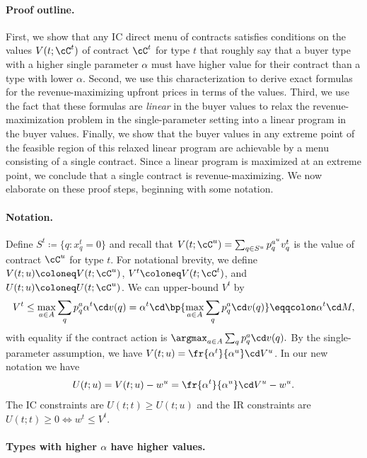 \paragraph{Proof outline.} First, we show that any IC direct menu of contracts satisfies conditions on the values $V(t;\cC^t)$ of contract $\cC^t$ for type $t$ that roughly say that a buyer type with a higher single parameter $\alpha$ must have higher value for their contract than a type with lower $\alpha$. Second, we use this characterization to derive exact formulas for the revenue-maximizing upfront prices in terms of the values. Third, we use the fact that these formulas are \emph{linear} in the buyer values to relax the revenue-maximization problem in the single-parameter setting into a linear program in the buyer values. Finally, we show that the buyer values in any extreme point of the feasible region of this relaxed linear program are achievable by a menu consisting of a single contract. Since a linear program is maximized at an extreme point, we conclude that a single contract is revenue-maximizing. We now elaborate on these proof steps, beginning with some notation.
 

\paragraph{Notation.}

Define $S^t \coloneq \{q : x^t_q = 0\}$ and recall that $V(t;\cC^u) = \sum_{q\in S^u} p^{a^u}_q v^t_q$ is the value of contract $\cC^u$ for type $t$. For notational brevity, we define $V(t;u) \coloneq V(t;\cC^u)$, $V^t \coloneq V(t;\cC^t)$, and $U(t;u) \coloneq U(t;\cC^u)$. We can upper-bound $V^t$ by $$V^t \le \max_{a\in A} \sum_q p^a_q \alpha^t \cd v(q) = \alpha^t \cd \bp{\max_{a\in A} \sum_q p^a_q \cd v(q)} \eqqcolon \alpha^t \cd M,$$ with equality if the contract action is $\argmax_{a\in A} \sum_q p^a_q \cd v(q).$ By the single-parameter assumption, we have $V(t;u) = \fr{\alpha^t}{\alpha^u} \cd V^u$. In our new notation we have
\begin{align*}
    U(t;u) = V(t;u) - w^u = \fr{\alpha^t}{\alpha^u} \cd V^u - w^u.
\end{align*}
The IC constraints are $U(t;t) \ge U(t;u)$ and the IR constraints are $U(t;t) \ge 0 \iff w^t \le V^t$.

\paragraph{Types with higher $\alpha$ have higher values.}

